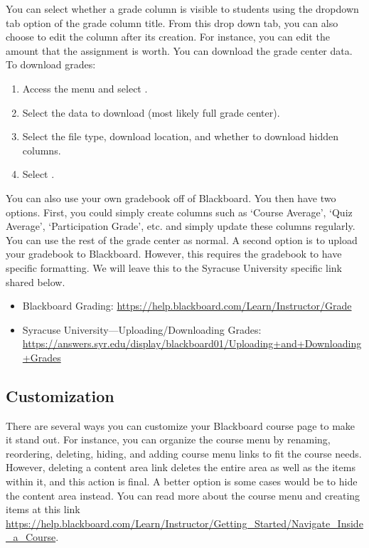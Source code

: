 You can select whether a grade column is visible to students using the dropdown tab option of the grade column title. From this drop down tab, you can also choose to edit the column after its creation. For instance, you can edit the amount that the assignment is worth. You can download the grade center data. To download grades:

	\begin{enumerate}[1.]
	\item Access the  menu and select .
	\item Select the data to download (most likely full grade center).
	\item Select the file type, download location, and whether to download hidden columns.
	\item Select . 
	\end{enumerate}

You can also use your own gradebook off of Blackboard. You then have two options. First, you could simply create columns such as `Course Average', `Quiz Average', `Participation Grade', etc. and simply update these columns regularly. You can use the rest of the grade center as normal. A second option is to upload your gradebook to Blackboard. However, this requires the gradebook to have specific formatting. We will leave this to the Syracuse University specific link shared below. 

	\begin{itemize}
	\item Blackboard Grading: \url{https://help.blackboard.com/Learn/Instructor/Grade}
	\item Syracuse University---Uploading/Downloading Grades: \url{https://answers.syr.edu/display/blackboard01/Uploading+and+Downloading+Grades}
	\end{itemize}



\subsection{Customization}

There are several ways you can customize your Blackboard course page to make it stand out. For instance, you can organize the course menu by renaming, reordering, deleting, hiding, and adding course menu links to fit the course needs. However, deleting a content area link deletes the entire area as well as the items within it, and this action is final. A better option is some cases would be to hide the content area instead. You can read more about the course menu and creating items at this link \url{https://help.blackboard.com/Learn/Instructor/Getting_Started/Navigate_Inside_a_Course}. 


